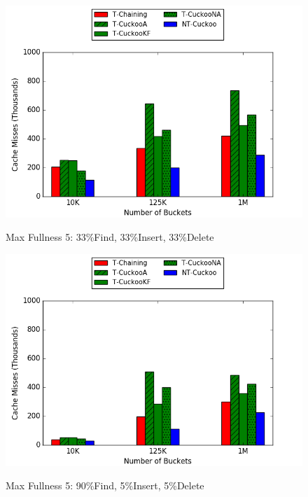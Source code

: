     \begin{figure}[H]
    \centering
        \begin{minipage}{0.75\textwidth}
        \centering
            {\includegraphics[width=\textwidth]{maps/335cm.png}}
            \caption*{Max Fullness 5: 33\%Find, 33\%Insert, 33\%Delete}
            \vspace{20pt}
        \end{minipage}
        \begin{minipage}{0.75\textwidth}
            \centering
            {\includegraphics[width=\textwidth]{maps/905cm.png}}
            \caption*{Max Fullness 5: 90\%Find, 5\%Insert, 5\%Delete}
        \end{minipage}
    \end{figure}

